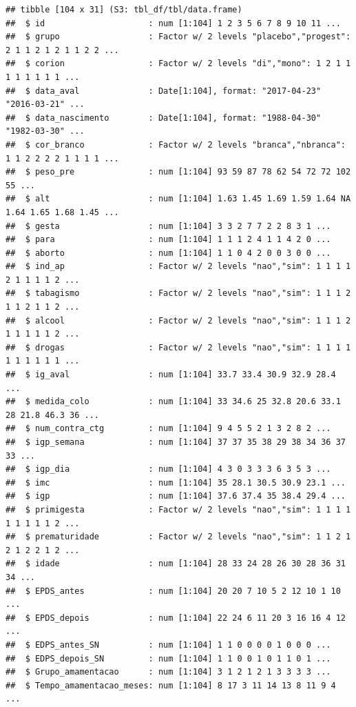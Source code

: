 \documentclass[
]{book}
\begin{document}
\begin{verbatim}
## tibble [104 x 31] (S3: tbl_df/tbl/data.frame)
##  $ id                     : num [1:104] 1 2 3 5 6 7 8 9 10 11 ...
##  $ grupo                  : Factor w/ 2 levels "placebo","progest": 2 1 1 2 1 2 1 1 2 2 ...
##  $ corion                 : Factor w/ 2 levels "di","mono": 1 2 1 1 1 1 1 1 1 1 ...
##  $ data_aval              : Date[1:104], format: "2017-04-23" "2016-03-21" ...
##  $ data_nascimento        : Date[1:104], format: "1988-04-30" "1982-03-30" ...
##  $ cor_branco             : Factor w/ 2 levels "branca","nbranca": 1 1 2 2 2 2 1 1 1 1 ...
##  $ peso_pre               : num [1:104] 93 59 87 78 62 54 72 72 102 55 ...
##  $ alt                    : num [1:104] 1.63 1.45 1.69 1.59 1.64 NA 1.64 1.65 1.68 1.45 ...
##  $ gesta                  : num [1:104] 3 3 2 7 7 2 2 8 3 1 ...
##  $ para                   : num [1:104] 1 1 1 2 4 1 1 4 2 0 ...
##  $ aborto                 : num [1:104] 1 1 0 4 2 0 0 3 0 0 ...
##  $ ind_ap                 : Factor w/ 2 levels "nao","sim": 1 1 1 1 2 1 1 1 1 2 ...
##  $ tabagismo              : Factor w/ 2 levels "nao","sim": 1 1 1 2 1 1 2 1 1 2 ...
##  $ alcool                 : Factor w/ 2 levels "nao","sim": 1 1 1 2 1 1 1 1 1 2 ...
##  $ drogas                 : Factor w/ 2 levels "nao","sim": 1 1 1 1 1 1 1 1 1 1 ...
##  $ ig_aval                : num [1:104] 33.7 33.4 30.9 32.9 28.4 ...
##  $ medida_colo            : num [1:104] 33 34.6 25 32.8 20.6 33.1 28 21.8 46.3 36 ...
##  $ num_contra_ctg         : num [1:104] 9 4 5 5 2 1 3 2 8 2 ...
##  $ igp_semana             : num [1:104] 37 37 35 38 29 38 34 36 37 33 ...
##  $ igp_dia                : num [1:104] 4 3 0 3 3 3 6 3 5 3 ...
##  $ imc                    : num [1:104] 35 28.1 30.5 30.9 23.1 ...
##  $ igp                    : num [1:104] 37.6 37.4 35 38.4 29.4 ...
##  $ primigesta             : Factor w/ 2 levels "nao","sim": 1 1 1 1 1 1 1 1 1 2 ...
##  $ prematuridade          : Factor w/ 2 levels "nao","sim": 1 1 2 1 2 1 2 2 1 2 ...
##  $ idade                  : num [1:104] 28 33 24 28 26 30 28 36 31 34 ...
##  $ EPDS_antes             : num [1:104] 20 20 7 10 5 2 12 10 1 10 ...
##  $ EPDS_depois            : num [1:104] 22 24 6 11 20 3 16 16 4 12 ...
##  $ EDPS_antes_SN          : num [1:104] 1 1 0 0 0 0 1 0 0 0 ...
##  $ EDPS_depois_SN         : num [1:104] 1 1 0 0 1 0 1 1 0 1 ...
##  $ Grupo_amamentacao      : num [1:104] 3 1 2 1 2 1 3 3 3 3 ...
##  $ Tempo_amamentacao_meses: num [1:104] 8 17 3 11 14 13 8 11 9 4 ...
\end{verbatim}
\end{document}
